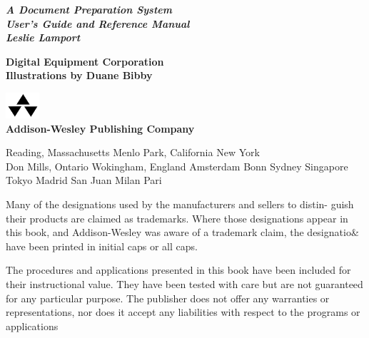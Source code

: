 \thispagestyle{plain}
\begin{titlepage}
  \centering
  \scalebox{11}{\LaTeX}

  \vspace*{4em}
  {\huge\sffamily\itshape\bfseries 
  A Document Preparation System\\[.5em] 
  User's Guide and Reference Manual\\[2em]
  Leslie Lamport}

  \bigskip 
  {\Large\bfseries\sffamily 
  Digital Equipment Corporation\\[4em]
  Illustrations by Duane Bibby}

  \vfill 
  \includegraphics[width=1.25cm]{./figure/addison-wesley-logo.png}\\[.5em]
  {\Large\bfseries Addison-Wesley Publishing Company}\\
  \bigskip
  \parbox{14cm}{\Large\sffamily\centering Reading, Massachusetts Menlo Park, California New York\\
  Don Mills, Ontario Wokingham, England Amsterdam Bonn Sydney
  Singapore Tokyo Madrid San Juan Milan Pari}
\end{titlepage}

\thispagestyle{plain}
\begin{center}
\vspace*{8em}
\parbox{.75\linewidth}{%
\qquad Many of the designations used by the manufacturers and sellers to distin-
guish their products are claimed as trademarks. Where those designations
appear in this book, and Addison-Wesley was aware of a trademark claim,
the designatio\& have been printed in initial caps or all caps.

\bigskip
\qquad The procedures and applications presented in this book have been included
for their instructional value. They have been tested with care but are not
guaranteed for any particular purpose. The publisher does not offer any
warranties or representations, nor does it accept any liabilities with respect
to the programs or applications}
\end{center}
\restoregeometry
